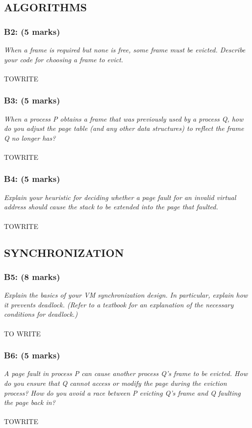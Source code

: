 \documentclass{article}
\begin{document}
\subsection{ALGORITHMS}

\subsubsection*{B2: (5 marks) }
\textit{When a frame is required but none is free, some frame must be evicted.  Describe your code for choosing a frame to evict.}
\\ \\
TOWRITE


\subsubsection*{B3: (5 marks) }
\textit{When a process P obtains a frame that was previously used by a
process Q, how do you adjust the page table (and any other data
structures) to reflect the frame Q no longer has? }
\\ \\
TOWRITE


\subsubsection*{B4: (5 marks) }
\textit{Explain your heuristic for deciding whether a page fault for an
invalid virtual address should cause the stack to be extended into
the page that faulted. }
\\\ \\
TOWRITE



\subsection{SYNCHRONIZATION}

\subsubsection*{B5: (8 marks) }
\textit{Explain the basics of your VM synchronization design.  In particular, explain how it prevents deadlock.  (Refer to a
 textbook for an explanation of the necessary conditions for deadlock.)}
\\ \\
TO WRITE


\subsubsection*{B6: (5 marks) }
\textit{A page fault in process P can cause another process Q's frame
to be evicted.  How do you ensure that Q cannot access or modify
the page during the eviction process?  How do you avoid a race
between P evicting Q's frame and Q faulting the page back in?
}
\\ \\
TOWRITE
\end{document}
